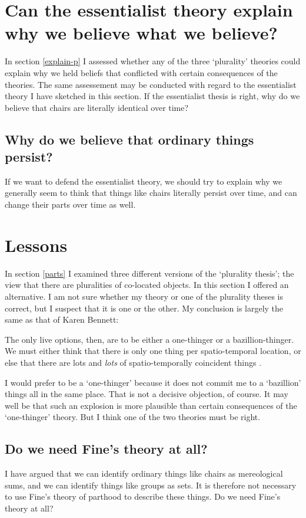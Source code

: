 \documentclass[11pt]{article}
\newenvironment{squote}{%
\begin{spacing}{1}
\begin{list}{}{%
\setlength{\labelwidth}{0pt}%
\rightmargin\leftmargin%
}
\item\relax
}{%
\end{list}%
\end{spacing}
}
\begin{document}
\begin{spacing}{1.5}
\section{Can the essentialist theory explain why we believe what we
  believe?}
\label{explain-e}
In section \ref{explain-p} I assessed whether any of the three
`plurality' theories could explain why we held beliefs that conflicted
with certain consequences of the theories.  The same assessement may
be conducted with regard to the essentialist theory I have sketched in
this section.  If the essentialist thesis is right, why do we believe
that chairs are literally identical over time?

\subsection{Why do we believe that ordinary things persist?}
\label{why-persist}
If we want to defend the essentialist theory, we should try to explain
why we generally seem to think that things like chairs literally
persist over time, and can change their parts over time as well.

\section{Lessons}
\label{lessons-e}
In section \ref{parts} I examined three different versions of the
`plurality thesis'; the view that there are pluralities of co-located
objects.  In this section I offered an alternative.  I am not sure
whether my theory or one of the plurality theses is correct, but I
suspect that it is one or the other.  My conclusion is largely the
same as that of Karen Bennett:

\begin{squote}
The only live options, then, are to be either a one-thinger or a
bazillion-thinger.  We must either think that there is only one thing per
spatio-temporal location, or else that there are lots and \emph{lots} of
spatio-temporally coincident things \citeyearpar[358]{bennett2004}.
\end{squote}

I would prefer to be a `one-thinger' because it does not commit me to
a `bazillion' things all in the same place.  That is not a decisive
objection, of course.  It may well be that such an explosion is more
plausible than certain consequences of the `one-thinger' theory.  But
I think one of the two theories must be right.

\subsection{Do we need Fine's theory at all?}
\label{need-fine}
I have argued that we can identify ordinary things like chairs as
mereological sums, and we can identify things like groups as sets.  It
is therefore not necessary to use Fine's theory of parthood to
describe these things.  Do we need Fine's theory at all?


\end{spacing}
\end{document}
